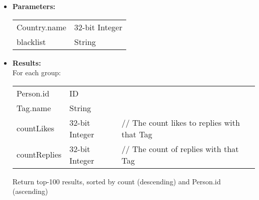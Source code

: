 {\begin{enumerate}
\begin{itemize}
                \item \textbf{Parameters:} \\
                    \begin{tabular}{ll}
                      Country.name & 32-bit Integer \\
                      blacklist & {String} \\
                    \end{tabular}
                \item \textbf{Results:} \\
                  For each group:
                    \begin{tabular}{lll}
                      Person.id & ID &  \\
                      Tag.name & String & \\
                      countLikes & 32-bit Integer & \parbox[t]{20cm}{ // The count likes to replies with that Tag \strut} \\
                      countReplies & 32-bit Integer & \parbox[t]{20cm}{ // The count of replies with that Tag \strut}\\
                    \end{tabular}
                    Return top-100 results, sorted by count (descending) and Person.id (ascending)
                    \end{itemize}


\end{enumerate}}
